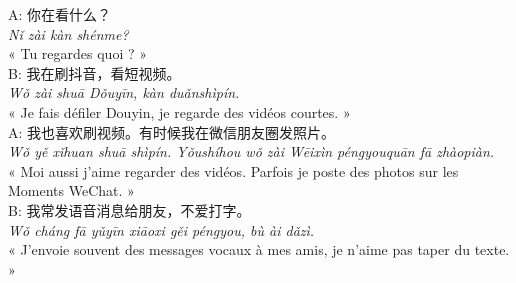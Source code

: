 \documentclass[11pt]{article}
\begin{document}
\begin{textebox}
A: 你在看什么？\\
\emph{Nǐ zài kàn shénme?}\\
« Tu regardes quoi ? »\\[4pt]
B: 我在刷抖音，看短视频。\\
\emph{Wǒ zài shuā Dǒuyīn, kàn duǎnshìpín.}\\
« Je fais défiler Douyin, je regarde des vidéos courtes. »\\[4pt]
A: 我也喜欢刷视频。有时候我在微信朋友圈发照片。\\
\emph{Wǒ yě xǐhuan shuā shìpín. Yǒushíhou wǒ zài Wēixìn péngyouquān fā zhàopiàn.}\\
« Moi aussi j'aime regarder des vidéos. Parfois je poste des photos sur les Moments WeChat. »\\[4pt]
B: 我常发语音消息给朋友，不爱打字。\\
\emph{Wǒ cháng fā yǔyīn xiāoxi gěi péngyou, bù ài dǎzì.}\\
« J'envoie souvent des messages vocaux à mes amis, je n'aime pas taper du texte. »
\end{textebox}
\end{document}
